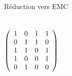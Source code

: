 \documentclass{beamer}
\begin{document}
\begin{frame}{}

\end{frame}

\begin{frame}{Réduction vers EMC}
  \begin{columns}

  \begin{displaymath}
   \left(\begin{array}{ c c c c c }
   1 & 0 & 1 & 1 \\
   0 & 1 & 1 & 0 \\
   1 & 1 & 0 & 1 \\
   1 & 0 & 0 & 1 \\
   0 & 1 & 0 & 0
  \end{array}\right)
  \end{displaymath}


\end{columns}
\end{frame}
\end{document}
